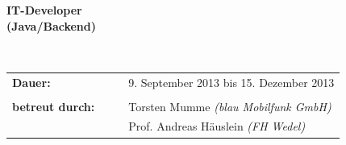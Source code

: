 \documentclass[a4paper, 12pt, hidelinks]{article}
\begin{document}
\begin{verbatim}
\end{verbatim}

\begin{center}
\textbf{IT-Developer} \\
\textbf{(Java/Backend)} \\
\end{center}

\begin{verbatim}


\end{verbatim}

\begin{flushleft}
\begin{tabular}{llll}

\textbf{Dauer:}
& & & 9. September 2013 bis 15. Dezember 2013
\\
\\
\textbf{betreut durch:}
& & & Torsten Mumme \emph{(blau Mobilfunk GmbH)} \\
& & & Prof. Andreas Häuslein \emph{(FH Wedel)}

\end{tabular}
\end{flushleft}


\newpage


\newpage


\tableofcontents
\newpage









\end{document}
